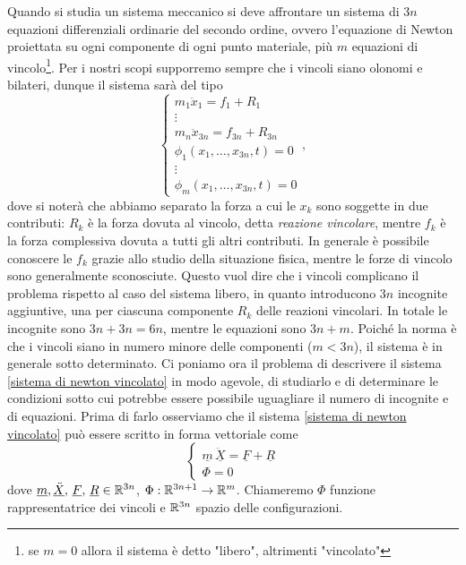    Quando si studia un sistema meccanico si deve affrontare un sistema di $3n$ equazioni differenziali ordinarie del secondo ordine, ovvero l'equazione di Newton proiettata su ogni componente di ogni punto materiale, più $m$ equazioni di vincolo\footnote{se $m=0$ allora il sistema è detto "libero", altrimenti "vincolato"}. Per i nostri scopi supporremo sempre che i vincoli siano olonomi e bilateri, dunque il sistema sarà del tipo
   \begin{equation}
       \begin{cases}
           m_1 \ddot{x}_1 = f_1 + R_1\\
           \vdots\\
           m_n \ddot{x}_{3n} = f_{3n} + R_{3n}\\
           \phi_1(x_1,\dots,x_{3n},t) = 0\\
           \vdots \\
           \phi_m(x_1,\dots,x_{3n},t) = 0
       \end{cases},
       \label{sistema di newton vincolato}
   \end{equation}
   dove si noterà che abbiamo separato la forza a cui le $x_k$ sono soggette in due contributi: $R_k$ è la forza dovuta al vincolo, detta \emph{reazione vincolare}, mentre $f_k$ è la forza complessiva dovuta a tutti gli altri contributi. In generale è possibile conoscere le $f_k$ grazie allo studio della situazione fisica, mentre le forze di vincolo sono generalmente sconosciute. Questo vuol dire che i vincoli complicano il problema rispetto al caso del sistema libero, in quanto introducono $3n$ incognite aggiuntive, una per ciascuna componente $R_k$ delle reazioni vincolari. In totale le incognite sono $3n+3n=6n$, mentre le equazioni sono $3n+m$. Poiché la norma è che i vincoli siano in numero minore delle componenti ($m<3n$), il sistema è in generale sotto determinato. Ci poniamo ora il problema di descrivere il sistema \ref{sistema di newton vincolato} in modo agevole, di studiarlo e di determinare le condizioni sotto cui potrebbe essere possibile uguagliare il numero di incognite e di equazioni. Prima di farlo osserviamo che il sistema \ref{sistema di newton vincolato} può essere scritto in forma vettoriale come
   \begin{equation}
   \begin{cases}
       \underline{m}\,\underline{\ddot{X}} = \underline{F}+\underline{R}\\
       \Phi = 0
    \end{cases}    
   \end{equation}
   dove $\underline{m},\underline{\ddot{X}},\,\underline{F},\,\underline{R} \in \mathbb{R}^{3n}$, $\Phi: \mathbb{R}^{3n+1} \to \mathbb{R}^m$. Chiameremo $\Phi$ funzione rappresentatrice dei vincoli e $\mathbb{R}^{3n}$ spazio delle configurazioni.
   
